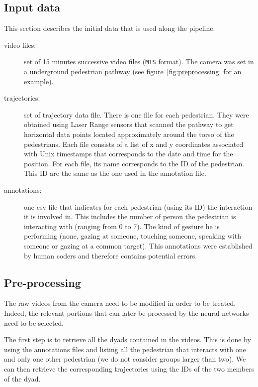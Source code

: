 \documentclass[12pt,a4paper,twoside]{article}
\begin{document}
\subsection{Input data}
\label{sec:input}

This section describes the initial data that is used along the pipeline. 

\begin{description}
    \item[video files:] set of 15 minutes successive video files (\texttt{MTS} format). The camera was set in a underground pedestrian pathway (see figure~\ref{fig:preprocessing} for an example).
    \item[trajectories:] set of trajectory data file. There is one file for each pedestrian. They were obtained using Laser Range sensors that scanned the pathway to get horizontal data points located approximately around the torso of the pedestrians. Each file consists of a list of x and y coordinates associated with Unix timestamps that corresponds to the date and time for the position. For each file, its name corresponds to the ID of the pedestrian. This ID are the same as the one used in the annotation file.
    \item[annotations:] one csv file that indicates for each pedestrian (using its ID) the interaction it is involved in. This includes the number of person the pedestrian is interacting with (ranging from 0 to 7). The kind of gesture he is performing (none, gazing at someone, touching someone, speaking with someone or gazing at a common target). This annotations were established by human coders and therefore contains potential errors.
\end{description}

\subsection{Pre-processing}
The raw videos from the camera need to be modified in order to be treated. Indeed, the relevant portions that can later be processed by the neural networks need to be selected. 

The first step is to retrieve all the dyads contained in the videos. This is done by using the annotations files and listing all the pedestrian that interacts with one and only one other pedestrian (we do not consider groups larger than two). We can then retrieve the corresponding trajectories using the IDs of the two members of the dyad.
\end{document}
